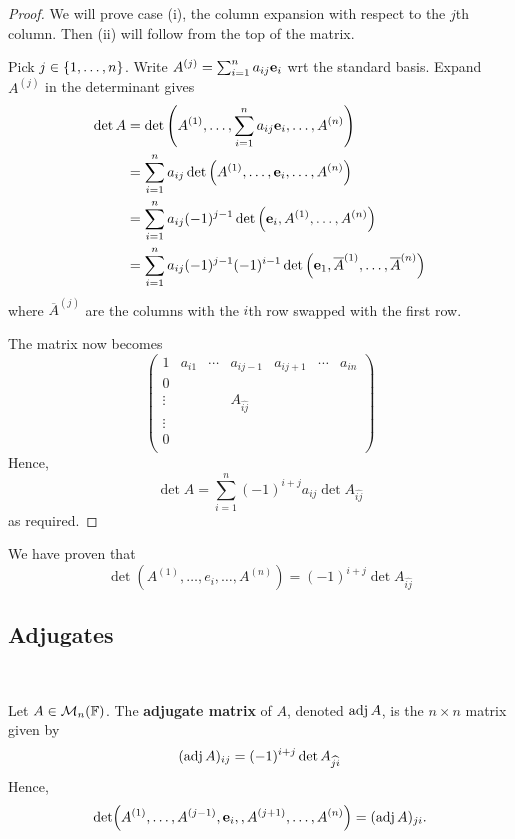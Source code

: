 \documentclass[a4paper]{article}
\begin{document}
\begin{proof}
	We will prove case (i), the column expansion with respect to the $ j $th column.
	Then (ii) will follow from the top of the matrix.

	Pick $ j \in \qty{1, \dots, n} $.
	Write $ A^{(j)} = \sum_{i=1}^n a_{ij} {\bf e}_i $ wrt the standard basis. Expand $A^{(j)}$ in the determinant gives
	\begin{align*}
		\det A & = \det\qty(A^{(1)}, \dots, \sum_{i=1}^n a_{ij} {\bf e}_i, \dots, A^{(n)})                                    \\
		       & = \sum_{i=1}^n a_{ij} \det\qty(A^{(1)}, \dots, {\bf e}_i, \dots, A^{(n)})                                    \\
		       & = \sum_{i=1}^n a_{ij} (-1)^{j-1} \det\qty({\bf e}_i, A^{(1)}, \dots, A^{(n)})                                \\
		       & = \sum_{i=1}^n a_{ij} (-1)^{j-1} (-1)^{i-1} \det\qty({\bf e}_1, \overline A^{(1)}, \dots, \overline A^{(n)})
	\end{align*}
	where $ \overline{A}^{(j)} $ are the columns with the $i$th row swapped with the first row. 

	The matrix now becomes 
	\[
		\begin{pmatrix}
			1 & a_{i 1} & \cdots & a_{i j-1} &  a_{i j+1} & \cdots & a_{i n} \\
			0 &  &  &  &  &  &  \\
			\vdots &  &  & A_{\widehat{ij}} &  &  & \\
			\vdots &  &  &  &  &  & \\
			0 &  &  &  &  &  & \\
		\end{pmatrix}
	\]
	Hence,
	\[
		\det A = \sum_{i=1}^n (-1)^{i+j} a_{ij} \det A_{\widehat{ij}}
	\]
	as required.
\end{proof}
We have proven that
\[
	\det (A^{(1)}, \dots, e_i, \dots, A^{(n)}) = (-1)^{i+j} \det A_{\widehat{ij}}
\]

\subsection{Adjugates}\ \vspace{-1.5em}
\begin{definition}
	Let $ A \in {\mathcal{M}}_n({\mathbb{F}}) $.
	The \textbf{adjugate matrix} of $ A $, denoted $ \operatorname{adj} A $, is the $ n \times n $ matrix given by
	\[
		(\operatorname{adj} A)_{ij} = (-1)^{i+j} \det A_{\widehat{ji}}
	\]
	Hence,
	\[
		\det (A^{(1)}, \dots, A^{(j-1)}, {\bf e}_i, , A^{(j+1)},\dots, A^{(n)}) = (\operatorname{adj} A)_{ji}.
	\]
\end{definition}
\end{document}
